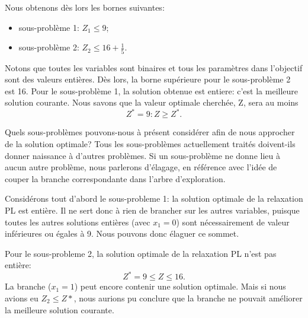 Nous obtenons dès lors les bornes suivantes:
\begin{itemize}
\item
sous-problème 1: $Z_1 \leq 9$;
\item
sous-problème 2: $Z_2 \leq 16+\frac{1}{5}$.
\end{itemize}
Notons que toutes les variables sont binaires et tous les paramètres dans l'objectif sont des valeurs entières.
Dès lors, la borne supérieure pour le sous-problème 2 est 16.
Pour le sous-problème 1, la solution obtenue est entiere: c'est la meilleure solution courante.
Nous savons que la valeur optimale cherchée, Z, sera au moins
\[
Z^* = 9: Z \geq Z^*.
\]

Quels sous-problèmes pouvons-nous à présent considérer afin de nous approcher de la solution optimale? Tous les sous-problèmes actuellement traités doivent-ils donner naissance à d'autres problèmes.
Si un sous-problème ne donne lieu à aucun autre problème, nous parlerons d'élagage, en référence avec l'idée de couper la branche correspondante dans l'arbre d'exploration.

Considérons tout d'abord le sous-probleme 1: la solution optimale de la relaxation PL est entière.
Il ne sert donc à rien de brancher sur les autres variables, puisque toutes les autres solutions entières (avec $x_1 = 0$) sont nécessairement de valeur inférieures ou égales à 9.
Nous pouvons donc élaguer ce sommet.

Pour le sous-probleme 2, la solution optimale de la relaxation PL n'est pas entière:
\[
Z^* = 9 \leq Z \leq 16.
\]
La branche ($x_1 = 1$) peut encore contenir une solution optimale.
Mais si nous avions eu $Z_2 \leq Z*$, nous aurions pu conclure que la
branche ne pouvait améliorer la meilleure solution courante.

